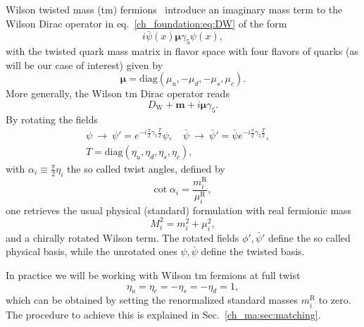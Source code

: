 Wilson twisted mass (tm) fermions~\cite{} introduce an imaginary mass term to the Wilson Dirac operator in eq.~\eqref{ch_foundation:eq:DW} of the form
\begin{equation}
i\bar{\psi}(x)\boldsymbol{\mu}\gamma_5\psi(x),
\end{equation}
with the twisted quark mass matrix in flavor space with four flavors of quarks (as will be our case of interest) given by
\begin{equation}
\boldsymbol{\mu}={\textrm{diag}}\left(\mu_u,-\mu_d,-\mu_s,\mu_c\right).
\end{equation}
More generally, the Wilson tm Dirac operator reads
\begin{equation}
D_{\textrm{W}}+\boldsymbol{m}+i\boldsymbol{\mu}\gamma_5.
\end{equation}
By rotating the fields
\begin{gather}
\label{ch_foundation:eq:chiral_rot}
\psi~\to~\psi' = e^{-i\frac{\pi}{2}\gamma_5 \frac{T}{2}}\psi, \quad
\bar{\psi}~\to~\bar{\psi}' = \bar{\psi} e^{-i\frac{\pi}{2}\gamma_5 \frac{T}{2}}, \quad \\
T = {\textrm{diag}}(\eta_u,\eta_d,\eta_s,\eta_c),
\end{gather}
with $\alpha_i\equiv\frac{\pi}{2}\eta_i$ the so called twist angles, defined by
\begin{equation}
{\textrm{cot}}\;\alpha_i=\frac{m_i^{\textrm{R}}}{\mu_i^{\textrm{R}}},
\end{equation}
one retrieves the usual physical (standard) formulation with real fermionic mass
\begin{equation}
M_i^2=m_i^2+\mu_i^2,
\end{equation}
and a chirally rotated Wilson term. The rotated fields $\phi',\bar{\psi}'$ define the so called physical basis, while the unrotated ones $\psi,\bar{\psi}$ define the twisted basis.

In practice we will be working with Wilson tm fermions at full twist
\begin{equation}
\eta_u=\eta_c=-\eta_s=-\eta_d=1,
\end{equation}
which can be obtained by setting the renormalized standard masses $m_i^{\textrm{R}}$ to zero. The procedure to achieve this is explained in Sec.~\ref{ch_ma:sec:matching}.


